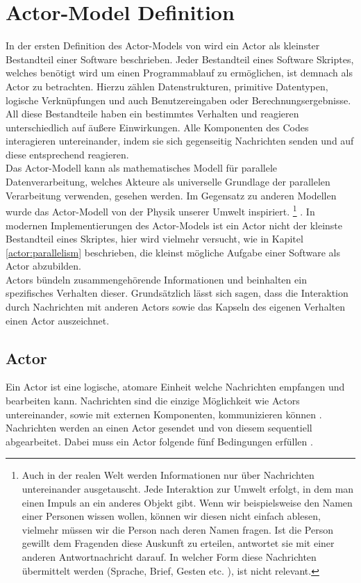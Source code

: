 \section{Actor-Model Definition}\label{actor:definition}
In der ersten Definition des Actor-Models von \citep{hewitt1973session} wird ein Actor als kleinster Bestandteil einer Software beschrieben. Jeder Bestandteil eines Software Skriptes, welches benötigt wird um einen Programmablauf zu ermöglichen, ist demnach als Actor zu betrachten. Hierzu zählen Datenstrukturen,  primitive Datentypen, logische Verknüpfungen und auch Benutzereingaben oder Berechnungsergebnisse. All diese Bestandteile haben ein bestimmtes Verhalten und reagieren unterschiedlich auf äußere Einwirkungen. Alle Komponenten des Codes interagieren untereinander, indem sie sich gegenseitig Nachrichten senden und auf diese entsprechend reagieren.\\
Das Actor-Modell kann als mathematisches Modell für parallele Datenverarbeitung, welches Akteure als universelle Grundlage der parallelen Verarbeitung verwenden, gesehen werden. Im Gegensatz zu anderen Modellen wurde das Actor-Modell von der Physik unserer Umwelt inspiriert. \footnote{Auch in der realen Welt werden Informationen nur über Nachrichten untereinander ausgetauscht. Jede Interaktion zur Umwelt erfolgt, in dem man einen Impuls an ein anderes Objekt gibt. Wenn wir beispielsweise den Namen einer Personen wissen wollen, können wir diesen nicht einfach ablesen, vielmehr müssen wir die Person nach deren Namen fragen. Ist die Person gewillt dem Fragenden diese Auskunft zu erteilen, antwortet sie mit einer anderen Antwortnachricht darauf. In welcher Form diese Nachrichten übermittelt werden (Sprache, Brief, Gesten etc. ), ist nicht relevant.} \citep{Vernon2015ReactiveAkka} .  In modernen Implementierungen des Actor-Models ist ein Actor nicht der kleinste Bestandteil eines Skriptes, hier wird vielmehr versucht, wie in Kapitel \ref{actor:parallelism} beschrieben, die kleinst mögliche Aufgabe einer Software als Actor abzubilden. \\
Actors bündeln zusammengehörende Informationen und beinhalten ein spezifisches Verhalten dieser.  Grundsätzlich lässt sich sagen, dass die Interaktion durch Nachrichten mit anderen Actors sowie das Kapseln des eigenen Verhalten einen Actor auszeichnet.

\subsection{Actor}
Ein Actor ist eine logische, atomare Einheit welche Nachrichten empfangen und bearbeiten kann. Nachrichten sind die einzige Möglichkeit wie Actors untereinander, sowie mit externen Komponenten, kommunizieren können \citep{Agha1985ConcurrentParallelism}. Nachrichten werden an einen Actor gesendet und von diesem sequentiell abgearbeitet. Dabei muss ein Actor folgende fünf Bedingungen erfüllen \citep{Agha1985ConcurrentParallelism}.

